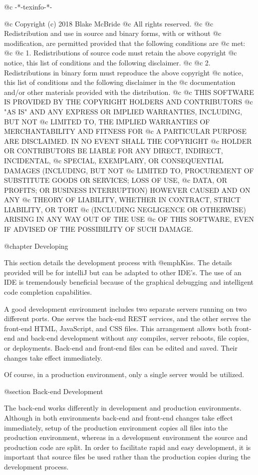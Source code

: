 @c -*-texinfo-*-

@c  Copyright (c) 2018 Blake McBride
@c  All rights reserved.
@c
@c  Redistribution and use in source and binary forms, with or without
@c  modification, are permitted provided that the following conditions are
@c  met:
@c
@c  1. Redistributions of source code must retain the above copyright
@c  notice, this list of conditions and the following disclaimer.
@c
@c  2. Redistributions in binary form must reproduce the above copyright
@c  notice, this list of conditions and the following disclaimer in the
@c  documentation and/or other materials provided with the distribution.
@c
@c  THIS SOFTWARE IS PROVIDED BY THE COPYRIGHT HOLDERS AND CONTRIBUTORS
@c  "AS IS" AND ANY EXPRESS OR IMPLIED WARRANTIES, INCLUDING, BUT NOT
@c  LIMITED TO, THE IMPLIED WARRANTIES OF MERCHANTABILITY AND FITNESS FOR
@c  A PARTICULAR PURPOSE ARE DISCLAIMED. IN NO EVENT SHALL THE COPYRIGHT
@c  HOLDER OR CONTRIBUTORS BE LIABLE FOR ANY DIRECT, INDIRECT, INCIDENTAL,
@c  SPECIAL, EXEMPLARY, OR CONSEQUENTIAL DAMAGES (INCLUDING, BUT NOT
@c  LIMITED TO, PROCUREMENT OF SUBSTITUTE GOODS OR SERVICES; LOSS OF USE,
@c  DATA, OR PROFITS; OR BUSINESS INTERRUPTION) HOWEVER CAUSED AND ON ANY
@c  THEORY OF LIABILITY, WHETHER IN CONTRACT, STRICT LIABILITY, OR TORT
@c  (INCLUDING NEGLIGENCE OR OTHERWISE) ARISING IN ANY WAY OUT OF THE USE
@c  OF THIS SOFTWARE, EVEN IF ADVISED OF THE POSSIBILITY OF SUCH DAMAGE.


@chapter Developing

This section details the development process with @emph{Kiss}.  The
details provided will be for intelliJ but can be adapted to other
IDE's.  The use of an IDE is tremendously beneficial because of the
graphical debugging and intelligent code completion capabilities.

A good development environment includes two separate servers running
on two different ports.  One serves the back-end REST services, and
the other serves the front-end HTML, JavaScript, and CSS files.  This
arrangement allows both front-end and back-end development without any
compiles, server reboots, file copies, or deployments.  Back-end and
front-end files can be edited and saved.  Their changes take effect
immediately.

Of course, in a production environment, only a single server would be
utilized.

@section Back-end Development

The back-end works differently in development and production
environments.  Although in both environments back-end and front-end
changes take effect immediately, setup of the production environment
copies all files into the production environment, whereas in a
development environment the source and production code are split.  In
order to facilitate rapid and easy development, it is important that
source files be used rather than the production copies during the
development process.  

